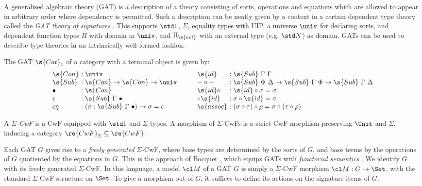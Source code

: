 A generalised algebraic theory (GAT) \cite{Cartmell1986-ig} is a description of
a theory consisting of sorts, operations and equations which are allowed to
appear in arbitrary order where dependency is permitted. Such a description can
be neatly given by a context in a certain dependent type theory called the
\emph{GAT theory of signatures} \cite{Kovacs2023-gq}. This supports $\std 1$,
$\Sigma$, equality types with UIP, a universe $\univ$ for declaring sorts, and
dependent function types $\Pi$ with domain in $\univ$, and $\Pi_\s{ext}$ with an
external type (e.g. $\std N$) as domain. GATs can be used to describe type
theories in an intrinsically well-formed fashion.
\begin{example}\label{ex:cat1}
The GAT $\s{Cat}_1$ of a category with a terminal object is given by:
\[\begin{array}{l@{\ }l}
  \s{Con} &: \univ \\
  \s{Sub} &: \s{Con} \to \s{Con} \to \univ \\
  \bullet &: \s{Con} \\
  \epsilon &: \s{Sub}\ \Gamma\ \bullet \\
  \epsilon\eta &: (\sigma : \s{Sub}\ \Gamma\ \bullet) \to \sigma = \epsilon
\end{array}
\qquad
\begin{array}{l@{\ }l}
  \s{id} &: \s{Sub}\ \Gamma\ \Gamma \\
  -\circ- &: \s{Sub}\ \Phi\ \Delta \to \s{Sub}\ \Gamma\ \Phi \to \s{Sub}\ \Gamma\ \Delta \\
  \s{id}\circ &: \s{id} \circ \sigma = \sigma \\
  \circ\s{id} &: \sigma \circ \s{id} = \sigma \\
  \s{assoc} &: (\sigma \circ \tau) \circ \rho = \sigma \circ (\tau \circ \rho)
\end{array}\]
\end{example}

\begin{definition}
A \emph{$\Sigma$-CwF}\label{def:sigma-cwf} is a CwF
equipped with $\std 1$ and $\Sigma$ types. A morphism of $\Sigma$-CwFs is a
strict CwF morphism preserving $\Unit$ and $\Sigma$, inducing a category
$\re{CwF}_{\Sigma} \subseteq \re{CwF}$.
\end{definition}

Each GAT $G$ gives rise to a \emph{freely generated} $\Sigma$-CwF, where base
types are determined by the sorts of $G$, and base terms by the operations of
$G$ quotiented by the equations in $G$. This is the approach of Bocquet
\cite{Bocquet2025-ox}, which equips GATs with \emph{functorial semantics}
\cite{Lawvere1963-qd}. We identify $G$ with its freely generated $\Sigma$-CwF.
In this language, a model\label{def:gat-model} $\cl M$ of a GAT $G$ is simply a
$\Sigma$-CwF morphism $\cl M : G \to \Set$, with the standard $\Sigma$-CwF
structure on $\Set$. To give a morphism out of $G$, it suffices to define its
actions on the signature items of $G$.

